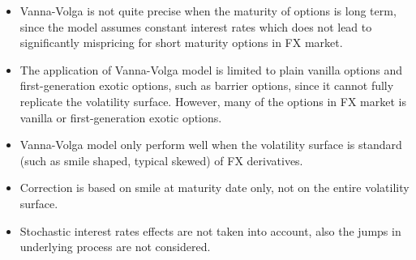 \begin{itemize}
	\item Vanna-Volga is not quite precise when the maturity of options is long term, since the model assumes constant interest rates which does not lead to significantly mispricing for short maturity options in FX market.
	\item The application of Vanna-Volga model is limited to plain vanilla options and first-generation exotic options, such as barrier options, since it cannot fully replicate the volatility surface. However, many of the options in FX market is vanilla or first-generation exotic options.
	\item Vanna-Volga model only perform well when the volatility surface is standard (such as smile shaped, typical skewed) of FX derivatives.
	\item Correction is based on smile at maturity date only, not on the entire volatility surface.
	\item Stochastic interest rates effects are not taken into account, also the jumps in underlying process are not considered.
\end{itemize}


